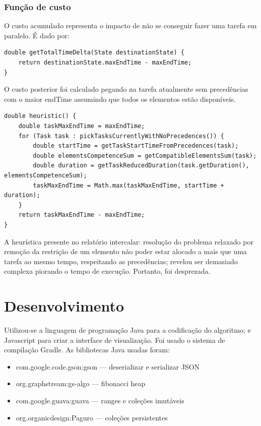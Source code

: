 \documentclass[a4paper,11pt]{article}
\begin{document}
\subsubsection{Função de custo}

O custo acumulado representa o impacto de não se conseguir fazer uma tarefa em paralelo. É dado por:
\begin{verbatim}
double getTotalTimeDelta(State destinationState) {
	return destinationState.maxEndTime - maxEndTime;
}
\end{verbatim}

O custo posterior foi calculado pegando na tarefa atualmente sem precedências com o maior endTime assumindo que todos os elementos estão disponíveis.
\begin{verbatim}
double heuristic() {
	double taskMaxEndTime = maxEndTime;
	for (Task task : pickTasksCurrentlyWithNoPrecedences()) {
		double startTime = getTaskStartTimeFromPrecedences(task);
		double elementsCompetenceSum = getCompatibleElementsSum(task);
		double duration = getTaskReducedDuration(task.getDuration(), elementsCompetenceSum);
		taskMaxEndTime = Math.max(taskMaxEndTime, startTime + duration);
	}
	return taskMaxEndTime - maxEndTime;
}
\end{verbatim}

A heurística presente no relatório intercalar: resolução do problema relaxado por remoção da restrição de um elemento não poder estar alocado a mais que uma tarefa ao mesmo tempo, respeitando as precedências; revelou ser demasiado complexa piorando o tempo de execução. Portanto, foi desprezada.

\section{Desenvolvimento}
Utilizou-se a linguagem de programação Java para a codificação do algoritmo; e Javascript para criar a interface de visualização. Foi usado o sistema de compilação Gradle. As bibliotecas Java usadas foram:
\begin{itemize}
	\item com.google.code.gson:gson — deserializar e serializar JSON
	\item org.graphstream:gs-algo — fibonacci heap
	\item com.google.guava:guava — ranges e coleções imutáveis
	\item org.organicdesign:Paguro — coleções persistentes
\end{itemize}
\end{document}
